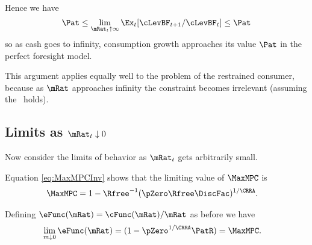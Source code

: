 \documentclass[BufferStockTheory]{subfiles}
\begin{document}
Hence we have
\begin{equation}
  {\Pat}  \leq \lim_{\mRat_{t} \uparrow \infty} \Ex_{t}[\cLevBF_{t+1}/\cLevBF_{t}] \leq {\Pat} \nonumber
\end{equation}
so as cash goes to infinity, consumption growth approaches its
value $\Pat$ in the perfect foresight model.

This argument applies equally well to the problem of the restrained
consumer, because as $\mRat$ approaches infinity the constraint becomes
irrelevant (assuming the \FHWC~holds).

\begin{comment}
  Of course, the constraint never becomes irrelevant if human wealth is
  infinite.  We ruled out infinite human wealth at the beginning of this
  section by assuming $\Rfree> \PGro$.  If this finite human wealth
  condition does not hold, it is possible to show that for any finite
  horizon consumer the marginal propensity to consume approaches the
  finite-horizon perfect foresight MPC as wealth approaches infinity.
  However, as the horizon gets longer, the perfect foresight MPC
  approaches zero.  It can be shown therefore that the limiting MPC for
  the converged consumption function approaches (but never reaches)
  zero.  (This is why we chose $\MinMinMPC=0$ if the \FHWC~fails
  in the proofs above.)
\end{comment}

\hypertarget{LimitsAsmtToZero}{}
\subsection{Limits as $\mRat_t \downarrow 0$}

\label{subsec:LimitsAsmtToZero} Now consider the limits of behavior as $\mRat_{t}$ gets
arbitrarily small.

Equation \eqref{eq:MaxMPCInv} shows that the limiting value of
$\MaxMPC$ is
\begin{equation}\begin{gathered}\begin{aligned}
  \MaxMPC  & = 1-{\Rfree}^{-1}(\pZero  \Rfree\DiscFac)^{1/\CRRA}. \nonumber
\end{aligned}\end{gathered}\end{equation}

Defining $\eFunc(\mRat)=\cFunc(\mRat)/\mRat$ as before we have
\begin{equation}\begin{gathered}\begin{aligned}
  \lim_{m \downarrow 0} \eFunc(\mRat)  & = (1-\pZero^{1/\CRRA}\PatR) = \MaxMPC \nonumber.
\end{aligned}\end{gathered}\end{equation}
\end{document}
